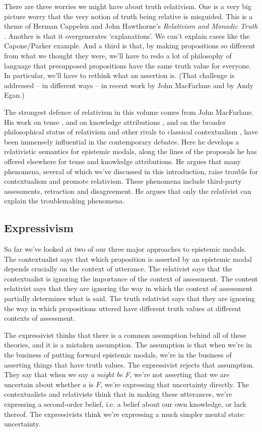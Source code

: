 There are three worries we might have about truth relativism. One is a very big picture worry that the very notion of truth being relative is misguided. This is a theme of Herman Cappelen and John Hawthorne's \textit{Relativism and Monadic Truth} \nocite{CappelenHawthorne2009}. Another is that it overgenerates `explanations'. We can't explain cases like the Capone/Parker example. And a third is that, by making propositions so different from what we thought they were, we'll have to redo a lot of philosophy of language that presupposed propositions have the same truth value for everyone. In particular, we'll have to rethink what an assertion is.  (That challenge is addressed -- in different ways -- in recent work by John MacFarlane and by Andy Egan.) 

The strongest defence of relativism in this volume comes from John MacFarlane. His work on tense \citep{MacFarlane2003-MACFCA}, and on knowledge attributions \citep{MacFarlane2005-Knowledge}, and on the broader philosophical status of relativism and other rivals to classical contextualism \citep{MacFarlane2005-MACMSO, MacFarlane2009-MACNC}, have been immensely influential in the contemporary debates. Here he develops a relativistic semantics for epistemic modals, along the lines of the proposals he has offered elsewhere for tense and knowledge attributions. He argues that many phenomena, several of which we've discussed in this introduction, raise trouble for contextualism and promote relativism. These phenomena include third-party assessments, retraction and disagreement. He argues that only the relativist can explain the troublemaking phenomena.

\subsection{Expressivism}
So far we've looked at two of our three major approaches to epistemic modals. The contextualist says that which proposition is asserted by an epistemic modal depends crucially on the context of utterance. The relativist says that the contextualist is ignoring the importance of the context of assessment. The content relativist says that they are ignoring the way in which the context of assessment partially determines what is said. The truth relativist says that they are ignoring the way in which propositions uttered have different truth values at different contexts of assessment.

The expressivist thinks that there is a common assumption behind all of these theories, and it is a mistaken assumption. The assumption is that when we're in the business of putting forward epistemic modals, we're in the business of asserting things that have truth values. The expressivist rejects that assumption. They say that when we say \textit{a might be F}, we're not asserting that we are uncertain about whether $a$ is $F$, we're expressing that uncertainty directly. The contextualists and relativists think that in making these utterances, we're expressing a second-order belief, i.e. a belief about our own knowledge, or lack thereof. The expressivists think we're expressing a much simpler mental state: uncertainty.

